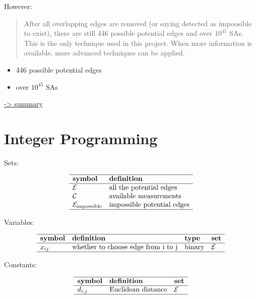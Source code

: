 \documentclass[
]{book}
\providecommand{\tightlist}{%
  \setlength{\itemsep}{0pt}\setlength{\parskip}{0pt}}
\begin{document}
However:

\begin{quote}
After all overlapping edges are removed (or saying detected as impoosible to
exist), there are still 446 possible potential edges and over \(10^{45}\) SAs.
This is the only technique used in this project. When more information is
available, more advanced techniques can be applied.
\end{quote}

\begin{itemize}
\tightlist
\item
  446 possible potential edges
\item
  over \(10^{45}\) SAs
\end{itemize}

\protect\hyperlink{summary}{-\textgreater{} summary}

\hypertarget{IP}{%
\section{Integer Programming}\label{IP}}

Sets:

\[
\begin{array}{ll}
  \hline
  \textbf{symbol} & \textbf{definition} \\
  \hline
  \mathcal{E}
  & \text{all the potential edges} \\
  \mathcal{C}
  & \text{available measurements} \\
  \mathcal{E}_\text{impossible}
  & \text{impossible potential edges} \\
  \hline
\end{array}
\]

Variables:

\[
\begin{array}{llll}
  \hline
  \textbf{symbol} & \textbf{definition} & \textbf{type} & \textbf{set} \\
  \hline
  x_{i j} & \text{whether to choose edge from i to j}
  & \text{binary} & \mathcal{E} \\
  \hline
\end{array}
\]

Constants:

\[
\begin{array}{lll}
  \hline
  \textbf{symbol} & \textbf{definition} & \textbf{set} \\
  \hline
  d_{i, j} & \text{Euclidean distance}
  & \mathcal{E} \\
  \hline
\end{array}
\]
\end{document}
